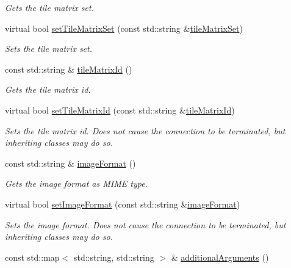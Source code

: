 \begin{DoxyCompactItemize}
\begin{DoxyCompactList}\small\item\em Gets the tile matrix set. \end{DoxyCompactList}\item 
virtual bool \hyperlink{group___imagery_module_ga56c3ba986ce399f2fc6a1d9dcf886b49}{set\+Tile\+Matrix\+Set} (const std\+::string \&\hyperlink{group___imagery_module_gae380a970bc0aa63d34e6f2295ea9c8f4}{tile\+Matrix\+Set})
\begin{DoxyCompactList}\small\item\em Sets the tile matrix set. \end{DoxyCompactList}\item 
const std\+::string \& \hyperlink{group___imagery_module_gae6a1721e1da9ab60ab4e62240baf304b}{tile\+Matrix\+Id} ()
\begin{DoxyCompactList}\small\item\em Gets the tile matrix id. \end{DoxyCompactList}\item 
virtual bool \hyperlink{group___imagery_module_ga5f85c6b91d45f419905321b3752aa70c}{set\+Tile\+Matrix\+Id} (const std\+::string \&\hyperlink{group___imagery_module_gae6a1721e1da9ab60ab4e62240baf304b}{tile\+Matrix\+Id})
\begin{DoxyCompactList}\small\item\em Sets the tile matrix id. Does not cause the connection to be terminated, but inheriting classes may do so. \end{DoxyCompactList}\item 
const std\+::string \& \hyperlink{group___imagery_module_ga847bc79084bf9856525ce04240a24428}{image\+Format} ()
\begin{DoxyCompactList}\small\item\em Gets the image format as M\+I\+ME type. \end{DoxyCompactList}\item 
virtual bool \hyperlink{group___imagery_module_ga9c0fa65750aaf5c860f046eccf6f0fe7}{set\+Image\+Format} (const std\+::string \&\hyperlink{group___imagery_module_ga847bc79084bf9856525ce04240a24428}{image\+Format})
\begin{DoxyCompactList}\small\item\em Sets the image format. Does not cause the connection to be terminated, but inheriting classes may do so. \end{DoxyCompactList}\item 
const std\+::map$<$ std\+::string, std\+::string $>$ \& \hyperlink{group___imagery_module_gae806d1f279ef82bd45c8375e96936836}{additional\+Arguments} ()

\end{DoxyCompactItemize}

